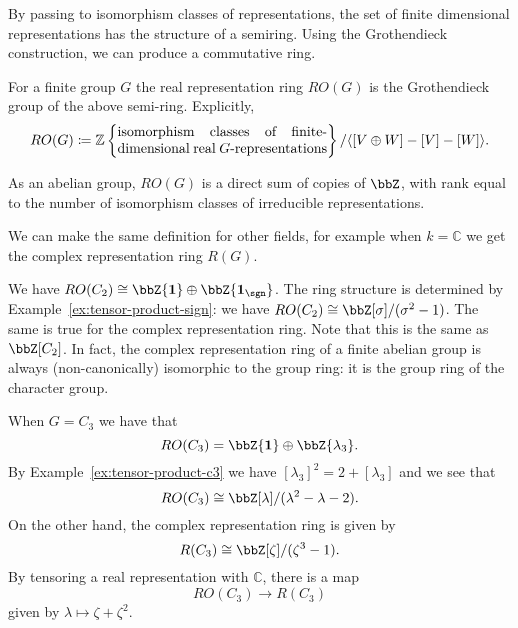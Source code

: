 \documentclass{willowtreebook}
\begin{document}
\begin{remark}
    By passing to isomorphism classes of representations, the set of finite dimensional representations has the structure of a semiring. Using the Grothendieck construction, we can produce a commutative ring. 
\end{remark}
\begin{definition}
    For a finite group $G$ the real representation ring $RO(G)$ is the Grothendieck group of the above semi-ring. Explicitly,
    \[
RO(G) \coloneqq \mathbb{Z}\left\{ \parbox{15em}{isomorphism classes of finite-dimensional real $G$-representations} \right\}/\langle [ V \oplus W] - [V] - [W] \rangle .
    \]
\end{definition}
\begin{remark}
    As an abelian group, $RO(G)$ is a direct sum of copies of $\bbZ$, with rank equal to the number of isomorphism classes of irreducible representations. 
\end{remark}
\begin{remark}
    We can make the same definition for other fields, for example when $k = \mathbb{C}$ we get the complex representation ring $R(G)$. 
\end{remark}
\begin{example}
    We have $RO(C_2) \cong \bbZ\{ \mathbf{1} \} \oplus \bbZ\{\mathbf{1}_{\sgn}\}$. The ring structure is determined by Example~\eqref{ex:tensor-product-sign}: we have $RO(C_2) \cong \bbZ[\sigma]/(\sigma^2-1)$. The same is true for the complex representation ring. Note that this is the same as $\bbZ[C_2]$. In fact, the complex representation ring of a finite abelian group is always (non-canonically) isomorphic to the group ring: it is the group ring of the character group. 
\end{example}
\begin{example}
    When $G = C_3$ we have that
    \[
RO(C_3) = \bbZ\{ \mathbf{1} \} \oplus \bbZ\{ \lambda_3 \}. 
    \]
    By Example~\eqref{ex:tensor-product-c3} we have $[\lambda_3]^2 = 2 + [\lambda_3]$ and we see that
    \[
RO(C_3) \cong \bbZ[\lambda]/(\lambda^2-\lambda-2). 
    \]
    On the other hand, the complex representation ring is given by \[
    R(C_3) \cong \bbZ[\zeta]/(\zeta^3-1).
    \]
    By tensoring a real representation with $\mathbb{C}$, there is a map
    \[
RO(C_3) \to R(C_3)
    \]
    given by $\lambda \mapsto \zeta + \zeta^2$. 
\end{example}
\par\bigskip\noindent

\end{document}
